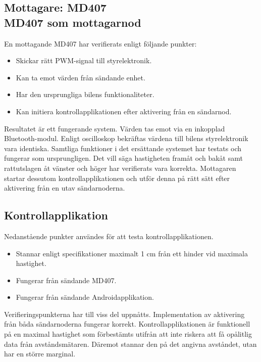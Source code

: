 \documentclass[a4paper]{article}
\begin{document}
\subsection{Mottagare: MD407 \\ MD407 som mottagarnod}
En mottagande MD407 har verifierats enligt följande punkter:

\begin{itemize}
\item Skickar rätt PWM-signal till styrelektronik.
\item Kan ta emot värden från sändande enhet.
\item Har den ursprungliga bilens funktionaliteter.
\item Kan initiera kontrollapplikationen efter aktivering från en sändarnod.
\end{itemize}

\noindent
Resultatet är ett fungerande system. Värden tas emot via en inkopplad Bluetooth-modul. Enligt oscilloskop bekräftas värdena till bilens styrelektronik vara identiska. Samtliga funktioner i det ersättande systemet har testats och fungerar som ursprungligen. Det vill säga hastigheten framåt och bakåt samt rattutslagen åt vänster och höger har verifierats vara korrekta. Mottagaren startar dessutom kontrollapplikationen och utför denna på rätt sätt efter aktivering från en utav sändarnoderna.




\subsection{Kontrollapplikation}
Nedanstående punkter användes för att testa kontrollapplikationen.

\begin{itemize}
\item Stannar enligt specifikationer maximalt 1 cm från ett hinder vid maximala hastighet.
\item Fungerar från sändande MD407.
\item Fungerar från sändande Androidapplikation.
\end{itemize}


\noindent
Verifieringspunkterna har till viss del uppnåtts. Implementation av aktivering från båda sändarnoderna fungerar korrekt. Kontrollapplikationen är funktionell på en maximal hastighet som förbestämts utifrån att inte riskera att få opålitlig data från avståndsmätaren. Däremot stannar den på det angivna avståndet, utan har en större marginal.
\end{document}
